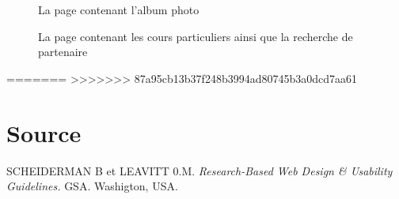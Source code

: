 \documentclass{article}[12pt]
\begin{document}
     \begin{figure}[H]
     	\centering
     	\caption{La page contenant l'album photo}
     \end{figure}
     \begin{figure}[H]
     	\centering
     	\caption{La page contenant les cours particuliers ainsi que la recherche de partenaire}
     \end{figure}
=======
>>>>>>> 87a95cb13b37f248b3994ad80745b3a0dcd7aa61
    \section{Source}

    SCHEIDERMAN B et LEAVITT 0.M. \textit{Research-Based Web Design \& Usability Guidelines.} GSA.  Washigton, USA.
    
\end{document}
